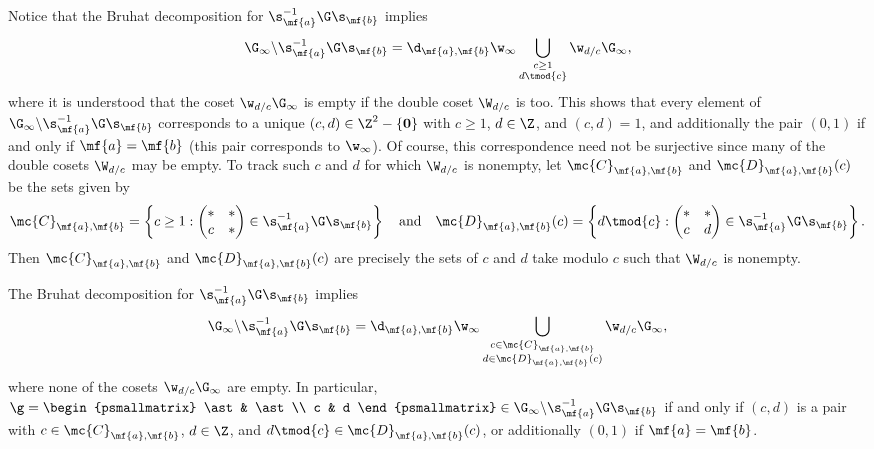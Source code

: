       Notice that the Bruhat decomposition for $\s_{\mf{a}}^{-1}\G\s_{\mf{b}}$ implies
      \[
        \G_{\infty}\backslash\s_{\mf{a}}^{-1}\G\s_{\mf{b}} = \d_{\mf{a},\mf{b}}\w_{\infty}\bigcup_{\substack{c \ge 1 \\ d \tmod{c}}}\w_{d/c}\G_{\infty},
      \]
      where it is understood that the coset $\w_{d/c}\G_{\infty}$ is empty if the double coset $\W_{d/c}$ is too. This shows that every element of $\G_{\infty}\backslash\s_{\mf{a}}^{-1}\G\s_{\mf{b}}$ corresponds to a unique $(c,d) \in \Z^{2}-\{\mathbf{0}\}$ with $c \ge 1$, $d \in \Z$, and $(c,d) = 1$, and additionally the pair $(0,1)$ if and only if $\mf{a} = \mf{b}$ (this pair corresponds to $\w_{\infty}$). Of course, this correspondence need not be surjective since many of the double cosets $\W_{d/c}$ may be empty. To track such $c$ and $d$ for which $\W_{d/c}$ is nonempty, let $\mc{C}_{\mf{a},\mf{b}}$ and $\mc{D}_{\mf{a},\mf{b}}(c)$ be the sets given by
      \[
        \mc{C}_{\mf{a},\mf{b}} = \left\{c \ge 1: \begin{pmatrix} \ast & \ast \\ c & \ast \end{pmatrix} \in \s_{\mf{a}}^{-1}\G\s_{\mf{b}}\right\} \quad \text{and} \quad \mc{D}_{\mf{a},\mf{b}}(c) = \left\{d \tmod{c}: \begin{pmatrix} \ast & \ast \\ c & d \end{pmatrix} \in \s_{\mf{a}}^{-1}\G\s_{\mf{b}}\right\}.
      \]
      Then $\mc{C}_{\mf{a},\mf{b}}$ and $\mc{D}_{\mf{a},\mf{b}}(c)$ are precisely the sets of $c$ and $d$ take modulo $c$ such that $\W_{d/c}$ is nonempty.

      \begin{remark}\label{rem:Bruhat_modulo_infity_exact}
        The Bruhat decomposition for $\s_{\mf{a}}^{-1}\G\s_{\mf{b}}$ implies
        \[
          \G_{\infty}\backslash\s_{\mf{a}}^{-1}\G\s_{\mf{b}} = \d_{\mf{a},\mf{b}}\w_{\infty}\bigcup_{\substack{c \in \mc{C}_{\mf{a},\mf{b}} \\ d \in \mc{D}_{\mf{a},\mf{b}}(c)}}\w_{d/c}\G_{\infty},
        \]
        where none of the cosets $\w_{d/c}\G_{\infty}$ are empty. In particular, $\g = \begin{psmallmatrix} \ast & \ast \\ c & d \end{psmallmatrix} \in \G_{\infty}\backslash\s_{\mf{a}}^{-1}\G\s_{\mf{b}}$ if and only if $(c,d)$ is a pair with $c \in \mc{C}_{\mf{a},\mf{b}}$, $d \in \Z$, and $d \tmod{c} \in \mc{D}_{\mf{a},\mf{b}}(c)$, or additionally $(0,1)$ if $\mf{a} = \mf{b}$.
      \end{remark}
      

